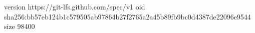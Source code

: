 version https://git-lfs.github.com/spec/v1
oid sha256:bb57eb124b1c579505ab97864b27f2765a2a45b89fb9bc0d4387de22096e9544
size 98400
